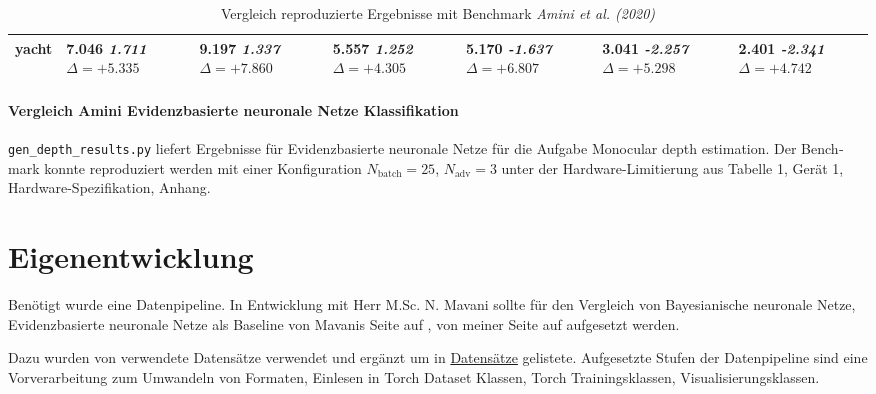\begin{otherlanguage}{ngerman}
\begin{table*}[!htbp]
\begin{tabularx}{\textwidth}{|l|X|X|X|X|X|X|}
yacht 
& 7.046 \newline \textit{1.711} \newline \mbox{$\Delta=+5.335$} 
& 9.197 \newline \textit{1.337} \newline \mbox{$\Delta=+7.860$} 
& 5.557 \newline \textit{1.252} \newline \mbox{$\Delta=+4.305$} 
& 5.170 \newline \textit{-1.637} \newline \mbox{$\Delta=+6.807$} 
& 3.041 \newline \textit{-2.257} \newline \mbox{$\Delta=+5.298$} 
& 2.401 \newline \textit{-2.341} \newline \mbox{$\Delta=+4.742$} \\ \hline
\end{tabularx}
\caption{Vergleich reproduzierte Ergebnisse mit Benchmark \textit{Amini et al. (2020)}}
\label{tab:comparison_ours_vs_amini_tabularx_v3}
\end{table*}


\paragraph{Vergleich Amini \gls{Evidenzbasierte neuronale Netze} Klassifikation} \parencite{amini2020deep} \texttt{gen\_depth\_results.py} liefert Ergebnisse für \gls{Evidenzbasierte neuronale Netze} für die Aufgabe \glqq Monocular depth estimation\grqq. Der Benchmark konnte reproduziert werden mit einer Konfiguration $N_\text{batch}=25$, $N_\text{adv}=3$ unter der Hardware-Limitierung aus Tabelle 1, Gerät 1, Hardware-Spezifikation, Anhang.



\section*{Eigenentwicklung}

Benötigt wurde eine Datenpipeline. In Entwicklung mit Herr M.Sc. N. Mavani sollte für den Vergleich von \gls{Bayesianische neuronale Netze}, \gls{Evidenzbasierte neuronale Netze} als Baseline von Mavanis Seite auf \parencite{Depeweg2019}, von meiner Seite auf \parencite{Ulmer2023} aufgesetzt werden.\newline

Dazu wurden von \parencite{Depeweg2019} verwendete Datensätze verwendet und ergänzt um in \hyperref[sec:datensaetze]{Datensätze} gelistete. Aufgesetzte Stufen der Datenpipeline sind eine Vorverarbeitung zum Umwandeln von Formaten, Einlesen in Torch Dataset Klassen, Torch Trainingsklassen, Visualisierungsklassen.\newline


\end{otherlanguage}
